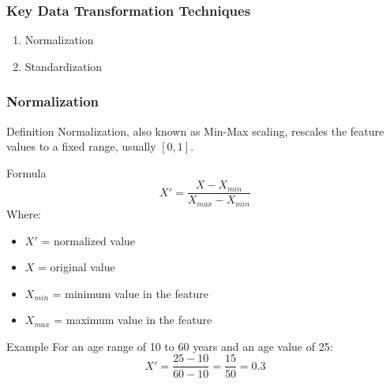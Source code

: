 \documentclass[aspectratio=169]{beamer}
\begin{document}
\begin{frame}[fragile]
    \frametitle{Key Data Transformation Techniques}
    \begin{enumerate}
        \item Normalization
        \item Standardization
    \end{enumerate}
\end{frame}

\begin{frame}[fragile]
    \frametitle{Normalization}
    \begin{block}{Definition}
        Normalization, also known as Min-Max scaling, rescales the feature values to a fixed range, usually \([0, 1]\).
    \end{block}
    \begin{block}{Formula}
        \begin{equation}
        X' = \frac{X - X_{min}}{X_{max} - X_{min}}
        \end{equation}
    Where:
        \begin{itemize}
            \item \(X'\) = normalized value
            \item \(X\) = original value
            \item \(X_{min}\) = minimum value in the feature
            \item \(X_{max}\) = maximum value in the feature
        \end{itemize}
    \end{block}
    \begin{block}{Example}
        For an age range of 10 to 60 years and an age value of 25:
        \begin{equation}
        X' = \frac{25 - 10}{60 - 10} = \frac{15}{50} = 0.3
        \end{equation}
    \end{block}
\end{frame}
\end{document}
